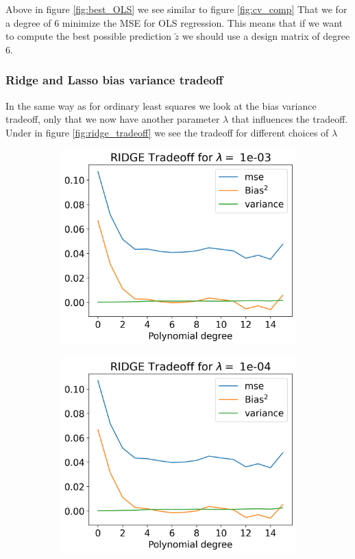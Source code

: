 \documentclass[12pt]{article}
\begin{document}
Above in figure \ref{fig:best_OLS} we see similar to figure \ref{fig:cv_comp} That we for a degree of 6 minimize the MSE for OLS regression. This means that if we want to compute the best possible prediction $\tilde{z}$ we should use a design matrix of degree 6.

\subsubsection{Ridge and Lasso bias variance tradeoff}
In the same way as for ordinary least squares we look at the bias variance tradeoff, only that we now have another parameter $\lambda$ that influences the tradeoff. Under in figure \ref{fig:ridge_tradeoff} we see the tradeoff for different choices of $\lambda$
\begin{figure}[H]
  \begin{subfigure}{.5\textwidth}
    \centering
    \includegraphics[width=\textwidth]{../figures/tradeoff_RIDGE_1e-03.png}
    \caption{}
    \label{fig:}
  \end{subfigure}
  \begin{subfigure}{.5\textwidth}
    \centering
    \includegraphics[width=\textwidth]{../figures/tradeoff_RIDGE_1e-04.png}

\end{subfigure}
\end{figure}
\end{document}
